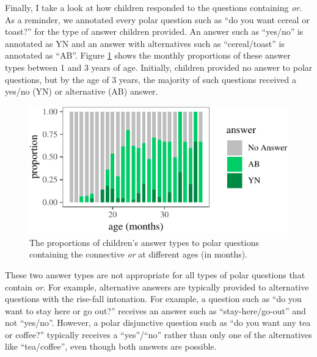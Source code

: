\documentclass[oneside]{report}
\theoremstyle{definition}
\theoremstyle{definition}
\theoremstyle{definition}
\theoremstyle{remark}
\begin{document}
Finally, I take a look at how children responded to the questions
containing \emph{or}. As a reminder, we annotated every polar question
such as ``do you want cereal or toast?'' for the type of answer children
provided. An answer such as ``yes/no'' is annotated as YN and an answer
with alternatives such as ``cereal/toast'' is annotated as ``AB''.
Figure \ref{fig:answerPlot} shows the monthly proportions of these
answer types between 1 and 3 years of age. Initially, children provided
no answer to polar questions, but by the age of 3 years, the majority of
such questions received a yes/no (YN) or alternative (AB) answer.
\begin{figure}[tb]

{\centering \includegraphics{figs/answerPlot-1} 

}

\caption{The proportions of children's answer types to polar questions containing the connective \textit{or} at different ages (in months).}\label{fig:answerPlot}
\end{figure}
These two answer types are not appropriate for all types of polar
questions that contain \emph{or}. For example, alternative answers are
typically provided to alternative questions with the rise-fall
intonation. For example, a question such as ``do you want to stay here
or go out?'' receives an answer such as ``stay-here/go-out'' and not
``yes/no''. However, a polar disjunctive question such as ``do you want
any tea or coffee?'' typically receives a ``yes''/``no'' rather than
only one of the alternatives like ``tea/coffee'', even though both
answers are possible.
\end{document}
